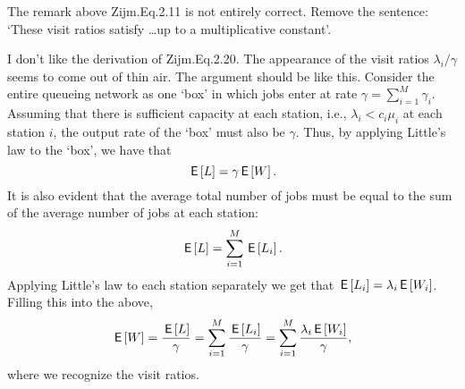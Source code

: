 The remark above Zijm.Eq.2.11 is not entirely correct. Remove the
sentence: `These visit ratios satisfy \ldots up to a multiplicative
constant'.


I don't like the derivation of Zijm.Eq.2.20. The appearance of the
visit ratios $\lambda_i/\gamma$ seems to come out of thin air. The
argument should be like this. Consider the entire queueing network as
one `box' in which jobs enter at rate $\gamma=\sum_{i=1}^M
\gamma_i$.
Assuming that there is sufficient capacity at each station, i.e.,
$\lambda_i < c_i \mu_i$ at each station $i$, the output rate of the `box' must also be $\gamma$. Thus, by applying Little's law to the `box', we have that 
\begin{equation*}
 \,\mathsf{E}\left[L\right] = \gamma \,\mathsf{E}\left[W\right]. 
\end{equation*}
It is also evident that the average total number of jobs must be equal
to the sum of the average number of jobs at each station: 
\begin{equation*}
 \,\mathsf{E}\left[L\right] = \sum_{i=1}^M \,\mathsf{E}\left[L_i\right].
\end{equation*}
Applying Little's law to each station separately we get that
$\,\mathsf{E}\left[L_i\right] = \lambda_i\,\mathsf{E}\left[W_i\right]$. Filling this into the above,
\begin{equation*}
\,\mathsf{E}\left[W\right] = \frac{\,\mathsf{E}\left[L\right]}{\gamma} = \sum_{i=1}^M \frac{\,\mathsf{E}\left[L_i\right]}\gamma = \sum_{i=1}^M \frac{\lambda_i \,\mathsf{E}\left[ W_i\right]}\gamma, 
\end{equation*}
where we recognize the visit ratios.


